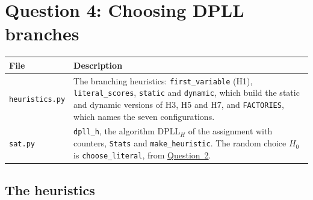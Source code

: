 \section{Question 4: Choosing DPLL branches}\label{sec:q4}

\begin{center}
\begin{tabular}{@{}p{6.2cm}p{10cm}@{}}
\toprule
File & Description\\
\midrule
\texttt{heuristics.py} & The branching heuristics: \texttt{first\_variable} (H1), \texttt{literal\_scores}, \texttt{static} and \texttt{dynamic}, which build the static and dynamic versions of H3, H5 and H7, and \texttt{FACTORIES}, which names the seven configurations.\\
\texttt{sat.py} & \texttt{dpll\_h}, the algorithm DPLL$_H$ of the assignment with counters, \texttt{Stats} and \texttt{make\_heuristic}. The random choice $H_0$ is \texttt{choose\_literal}, from \hyperref[sec:q2]{Question~2}.\\
\bottomrule
\end{tabular}
\end{center}

\subsection{The heuristics}

